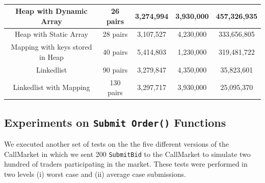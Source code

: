 \begin{table}[]
\begin{tabular}{|c|c|c|c|c|}
	Heap with Dynamic Array         			& 26 pairs                & 3,274,994            & 3,930,000             & 457,326,935                      \\ \hline
	Heap with Static Array           			& 28 pairs                & 3,107,527            & 4,230,000             & 333,656,805                       \\ \hline
	Mapping with keys stored in Heap 		& 40 pairs                & 5,414,803            & 1,230,000              & 319,481,722                       \\ \hline
	Linkedlist                       				& 90 pairs                & 3,279,847            & 4,350,000              & 35,823,601                        	\\ \hline
	Linkedlist with Mapping          			& 130 pairs              & 3,297,717            & 3,930,000               & 25,095,370                        \\ \hline

\end{tabular}
\caption{\footnotesize{}\label{tab:worst_case_matching}}
\end{table}




 \subsection{Experiments on \texttt{Submit Order()} Functions}

We executed another set of tests on the the five different versions of the CallMarket in which we sent 200 \texttt{SubmitBid} to the CallMarket to simulate two hundred of traders participating in the market. These tests were performed in two levels (i) worst case and (ii) average case submissions. 


